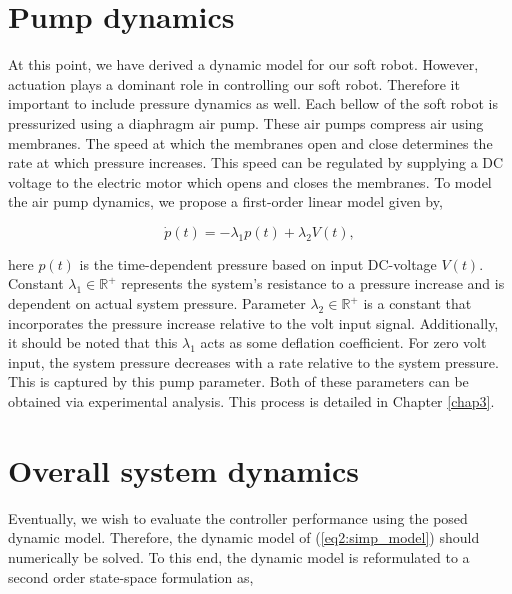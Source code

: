 \section{Pump dynamics}

At this point, we have derived a dynamic model for our soft robot. However, actuation plays a dominant role in controlling our soft robot. Therefore it important to include pressure dynamics as well. Each bellow of the soft robot is pressurized using a diaphragm air pump. These air pumps compress air using membranes. The speed at which the membranes open and close determines the rate at which pressure increases. This speed can be regulated by supplying a DC voltage to the electric motor which opens and closes the membranes. To model the air pump dynamics, we propose a first-order linear model given by,

\begin{equation}
    \dot{p}(t) = -\lambda_1 p(t) + \lambda_2 V(t),
    \label{eq2:pumpmodel}
\end{equation}

here $p(t)$ is the time-dependent pressure based on input DC-voltage $V(t)$. Constant $\lambda_1 \in \mathbb{R}^+$ represents the system's resistance to a pressure increase and is dependent on actual system pressure. Parameter $\lambda_2 \in \mathbb{R}^+$ is a constant that incorporates the pressure increase relative to the volt input signal. Additionally, it should be noted that this $\lambda_1$ acts as some deflation coefficient. For zero volt input, the system pressure decreases with a rate relative to the system pressure. This is captured by this pump parameter. Both of these parameters can be obtained via experimental analysis. This process is detailed in Chapter \ref{chap3}. 




\section{Overall system dynamics}

Eventually, we wish to evaluate the controller performance using the posed dynamic model. Therefore, the dynamic model of (\ref{eq2:simp_model}) should numerically be solved. To this end, the dynamic model is reformulated to a second order state-space formulation as,

